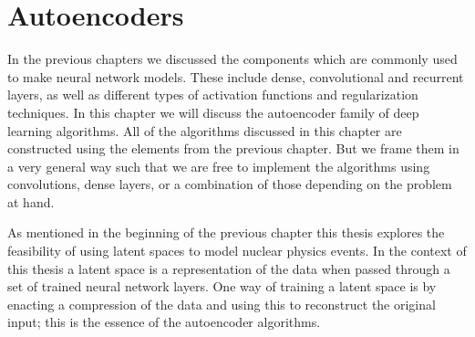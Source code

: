 
\chapter{Autoencoders}\label{ch:autoencoder}

In the previous chapters we discussed the components which are commonly used to make neural network models. These include dense, convolutional and recurrent layers, as well as different types of activation functions and regularization techniques. In this chapter we will discuss the autoencoder family of deep learning algorithms. All of the algorithms discussed in this chapter are constructed using the elements from the previous chapter. But we frame them in a very general way such that we are free to implement the algorithms using convolutions, dense layers, or a combination of those depending on the problem at hand.

As mentioned in the beginning of the previous chapter this thesis explores the feasibility of using latent spaces to model nuclear physics events. In the context of this thesis a latent space is a representation of the data when passed through a set of trained neural network layers. One way of training a latent space is by enacting a compression of the data and using this to reconstruct the original input; this is the essence of the autoencoder algorithms.